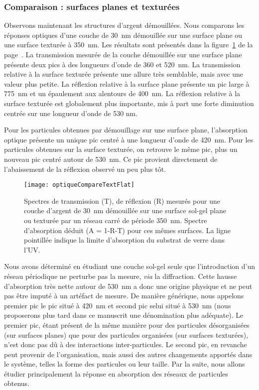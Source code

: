 	\subsubsection{Comparaison : surfaces planes et texturées}
Observons maintenant les structures d’argent démouillées. Nous comparons les réponses optiques d’une couche de 30~nm démouillée sur une surface plane ou une surface texturée à 350~nm. Les résultats sont présentés dans la figure~\ref{optiqueCompareTextFlat} de la page~\pageref{optiqueCompareTextFlat}. La transmission mesurée de la couche démouillée sur une surface plane présente deux pics à des longueurs d'onde de 360 et 520~nm. La transmission relative à la surface texturée présente une allure très semblable, mais avec une valeur plus petite. La réflexion relative à la surface plane présente un pic large à 775~nm et un épaulement aux alentours de 400~nm. La réflexion relative à la surface texturée est globalement plus importante, mis à part une forte diminution centrée sur une longueur d'onde de 530 nm.\par 
Pour les particules obtenues par démouillage sur une surface plane, l'absorption optique présente un unique pic centré à une longueur d'onde de 420~nm. Pour les particules obtenues sur la surface texturée, on retrouve le même pic, plus un nouveau pic centré autour de 530~nm. Ce pic provient directement de l'abaissement de la réflexion observé un peu plus tôt.\par 

\begin{figure}[!p]
\centering
\texttt{[image: optiqueCompareTextFlat]}
\caption{Spectres de transmission (T), de réflexion (R) mesurés pour une couche d’argent de 30~nm démouillée sur une surface sol-gel plane ou texturée par un réseau carré de période 350~nm. Spectre d’absorption déduit (A = 1-R-T) pour ces mêmes surfaces. La ligne pointillée indique la limite d’absorption du substrat de verre dans l’UV.}
\label{optiqueCompareTextFlat}
\end{figure}
Nous avons déterminé en étudiant une couche sol-gel seule que l'introduction d'un réseau périodique ne perturbe pas la mesure, \textit{via} la diffraction. Cette hausse d'absorption très nette autour de 530~nm a donc une origine physique et ne peut pas être imputé à un artéfact de mesure. De manière générique, nous appelons \og premier pic \fg{} le pic situé à 420~nm et \og second pic \fg{} selui situé à 530~nm (nous proposerons plus tard dans ce manuscrit une dénomination plus adéquate). Le premier pic, étant présent de la même manière pour des particules désorganisées (sur surfaces planes) que pour des particules organisées (sur surfaces texturées), n'est donc pas dû à des interactions inter-particules. Le second pic, en revanche peut provenir de l'organisation, mais aussi des autres changements apportés dans le système, telles la forme des particules ou leur taille. Par la suite, nous allons étudier principalement la réponse en absorption des réseaux de particules obtenus. \par 
   
